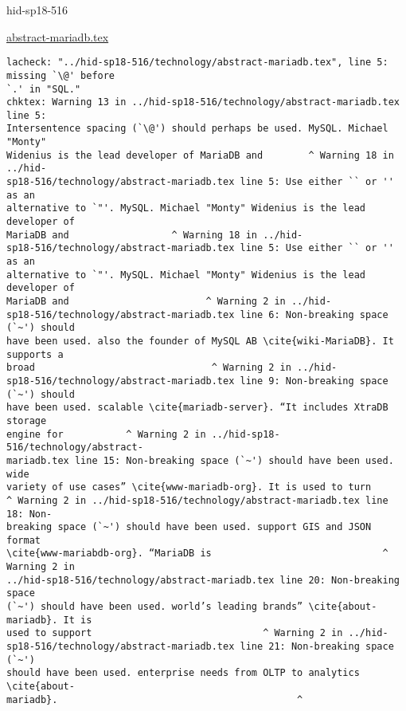 \begin{IU}

hid-sp18-516

\href{https://github.com/cloudmesh-community/hid-sp18-516/blob/master//technology/abstract-mariadb.tex}{abstract-mariadb.tex}

\begin{tiny}
\begin{verbatim}
lacheck: "../hid-sp18-516/technology/abstract-mariadb.tex", line 5: missing `\@' before
`.' in "SQL."
chktex: Warning 13 in ../hid-sp18-516/technology/abstract-mariadb.tex line 5:
Intersentence spacing (`\@') should perhaps be used. MySQL. Michael "Monty"
Widenius is the lead developer of MariaDB and        ^ Warning 18 in ../hid-
sp18-516/technology/abstract-mariadb.tex line 5: Use either `` or '' as an
alternative to `"'. MySQL. Michael "Monty" Widenius is the lead developer of
MariaDB and                  ^ Warning 18 in ../hid-
sp18-516/technology/abstract-mariadb.tex line 5: Use either `` or '' as an
alternative to `"'. MySQL. Michael "Monty" Widenius is the lead developer of
MariaDB and                        ^ Warning 2 in ../hid-
sp18-516/technology/abstract-mariadb.tex line 6: Non-breaking space (`~') should
have been used. also the founder of MySQL AB \cite{wiki-MariaDB}. It supports a
broad                               ^ Warning 2 in ../hid-
sp18-516/technology/abstract-mariadb.tex line 9: Non-breaking space (`~') should
have been used. scalable \cite{mariadb-server}. “It includes XtraDB storage
engine for           ^ Warning 2 in ../hid-sp18-516/technology/abstract-
mariadb.tex line 15: Non-breaking space (`~') should have been used. wide
variety of use cases” \cite{www-mariadb-org}. It is used to turn
^ Warning 2 in ../hid-sp18-516/technology/abstract-mariadb.tex line 18: Non-
breaking space (`~') should have been used. support GIS and JSON format
\cite{www-mariabdb-org}. “MariaDB is                              ^ Warning 2 in
../hid-sp18-516/technology/abstract-mariadb.tex line 20: Non-breaking space
(`~') should have been used. world’s leading brands” \cite{about-mariadb}. It is
used to support                              ^ Warning 2 in ../hid-
sp18-516/technology/abstract-mariadb.tex line 21: Non-breaking space (`~')
should have been used. enterprise needs from OLTP to analytics \cite{about-
mariadb}.                                          ^
\end{verbatim}
\end{tiny}
\end{IU}

